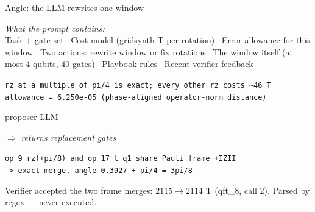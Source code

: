 \documentclass[10pt]{beamer}
\begin{document}
\begin{frame}{Angle: the LLM rewrites one window}

{\footnotesize\itshape What the prompt contains:}\\[1pt]
{\scriptsize Task + gate set \textbullet\ Cost model (gridsynth T per rotation) \textbullet\ Error allowance for this window \textbullet\ Two actions: rewrite window or fix rotations \textbullet\ The window itself (at most 4 qubits, 40 gates) \textbullet\ Playbook rules \textbullet\ Recent verifier feedback}

\vspace{0.2cm}
\colorbox{blue!7}{\parbox{0.97\linewidth}{\scriptsize \texttt{rz at a multiple of pi/4 is exact; every other rz costs \textasciitilde{}46 T}\\\texttt{allowance = 6.250e-05 (phase-aligned operator-norm distance)}}}

\vspace{0.35cm}
\begin{center}
\colorbox{orange!16}{\parbox{2.8cm}{\centering\normalsize proposer LLM}}
\qquad$\Longrightarrow$\qquad
{\scriptsize\itshape returns replacement gates}
\end{center}

\vspace{0.35cm}
\colorbox{blue!7}{\parbox{0.97\linewidth}{\scriptsize \texttt{op 9 rz(+pi/8) and op 17 t q1 share Pauli frame +IZII}\\\texttt{-> exact merge, angle 0.3927 + pi/4 = 3pi/8}}}

\vspace{0.25cm}
\raggedright\footnotesize
Verifier accepted the two frame merges: $2115 \to 2114$ T (qft\_8, call 2). Parsed by regex --- never executed.

\end{frame}
\end{document}
